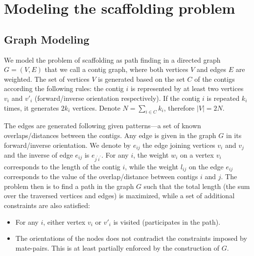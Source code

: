 \documentclass{endmH}
\begin{document}
\section{Modeling the scaffolding problem}\label{Model description}
\subsection{Graph Modeling}\label{sub:Graph_Modelling}



We model the problem of scaffolding as path finding in a directed graph $G=(V,E)$ that we call a contig graph, where  both  vertices $V$ and  edges $E$ are weighted. The set of vertices $V$ is generated  based on the set $C$ of the contigs according the following rules:  the contig $i$ is represented by at least  two vertices $v_i$ and $v'_i$ (forward/inverse  orientation respectively).  If the contig $i$ is repeated $k_i$ times, it generates $2k_i$ vertices.  %
Denote $N= \sum_{i\in C} k_i$, therefore $|V|=2N$.

 The edges are generated following given patterns---a set of known overlaps/distances between the contigs. 
 Any edge is given in the graph $G$ in its forward/inverse orientation. We denote by $e_{ij}$ the edge joining vertices $v_i$ and $v_j$ and the inverse of
  edge  $e_{ij}$ is  $e_{j^{'}i^{'}}$.
 For any $i$, the weight $w_i$ on a vertex $v_i$ corresponds to the length of the contig $i$, while the weight $l_{ij}$ on the edge  $e_{ij}$  corresponds to the value of the  overlap/distance between  contigs $i$ and $j$.   The problem then is to find a path in the graph $G$ such that the total  length (the sum over the traversed vertices and edges) is maximized, %
 while a set of additional constraints are also satisfied:
\begin{itemize}
  \item For any $i$, either vertex $v_i$ or $v'_i$ is visited  (participates in the path).
  \item The orientations of the nodes does not contradict the constraints
    imposed by  mate-pairs. This is at least partially enforced by the
    construction of $G$. 
\end{itemize}
\end{document}

